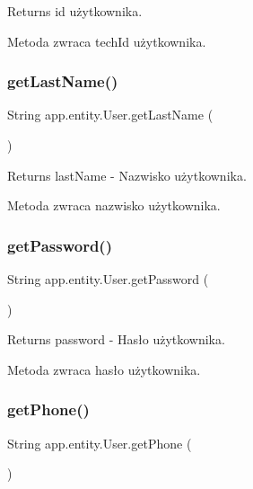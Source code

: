 \begin{DoxyReturn}{Returns}
id użytkownika.
\end{DoxyReturn}
Metoda zwraca tech\+Id użytkownika. \mbox{\label{classapp_1_1entity_1_1_user_a342467edf8f8b70770f8cdb00f084044}} 
\subsubsection{\texorpdfstring{getLastName()}{getLastName()}}
{\footnotesize\ttfamily String app.\+entity.\+User.\+get\+Last\+Name (\begin{DoxyParamCaption}{ }\end{DoxyParamCaption})}

\begin{DoxyReturn}{Returns}
last\+Name -\/ Nazwisko użytkownika.
\end{DoxyReturn}
Metoda zwraca nazwisko użytkownika. \mbox{\label{classapp_1_1entity_1_1_user_ab312bc2374fca053fa626959538396c3}} 
\subsubsection{\texorpdfstring{getPassword()}{getPassword()}}
{\footnotesize\ttfamily String app.\+entity.\+User.\+get\+Password (\begin{DoxyParamCaption}{ }\end{DoxyParamCaption})}

\begin{DoxyReturn}{Returns}
password -\/ Hasło użytkownika.
\end{DoxyReturn}
Metoda zwraca hasło użytkownika. \mbox{\label{classapp_1_1entity_1_1_user_a889c34f5c122dcc41694df9553095102}} 
\subsubsection{\texorpdfstring{getPhone()}{getPhone()}}
{\footnotesize\ttfamily String app.\+entity.\+User.\+get\+Phone (\begin{DoxyParamCaption}{ }\end{DoxyParamCaption})}


